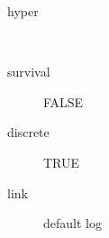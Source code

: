 \begin{description}
	\item[hyper]\ 
	 \item[ survival ] FALSE 
	 \item[ discrete ] TRUE 
	 \item[ link ] default log 
\end{description}
